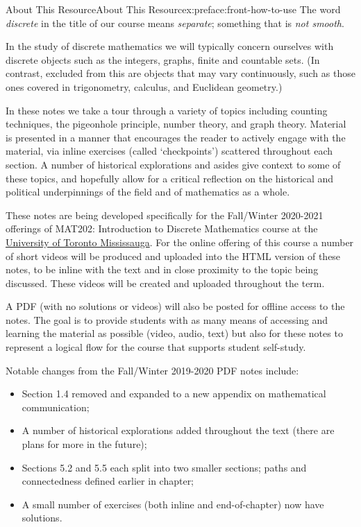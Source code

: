 \documentclass[oneside,10pt,]{book}
\numberwithin{equation}{section}
\begin{document}
%
%
\typeout{************************************************}
\typeout{************************************************}
%
\begin{preface}{About This Resource}{}{About This Resource}{}{}{x:preface:front-how-to-use}
The word \emph{discrete} in the title of our course means \emph{separate}; something that is \emph{not smooth}.%
\par
In the study of discrete mathematics we will typically concern ourselves with discrete objects such as the integers, graphs, finite and countable sets. (In contrast, excluded from this are objects that may vary continuously, such as those ones covered in trigonometry, calculus, and Euclidean geometry.)%
\par
In these notes we take a tour through a variety of topics including counting techniques, the pigeonhole principle, number theory, and graph theory. Material is presented in a manner that encourages the reader to actively engage with the material, via inline exercises (called `checkpoints') scattered throughout each section. A number of historical explorations and asides give context to some of these topics, and hopefully allow for a critical reflection on the historical and political underpinnings of the field and of mathematics as a whole.%
\par
These notes are being developed specifically for the Fall\slash{}Winter 2020-2021 offerings of MAT202: Introduction to Discrete Mathematics course at the \href{https://www.utm.utoronto.ca/math-cs-stats/home}{University of Toronto Mississauga}. For the online offering of this course a number of short videos will be produced and uploaded into the HTML version of these notes, to be inline with the text and in close proximity to the topic being discussed. These videos will be created and uploaded throughout the term.%
\par
A PDF (with no solutions or videos) will also be posted for offline access to the notes. The goal is to provide students with as many means of accessing and learning the material as possible (video, audio, text) but also for these notes to represent a logical flow for the course that supports student self-study.%
\par
Notable changes from the Fall\slash{}Winter 2019-2020 PDF notes include:%
\begin{itemize}[label=\textbullet]
\item{}Section 1.4 removed and expanded to a new appendix on mathematical communication;%
\item{}A number of historical explorations added throughout the text (there are plans for more in the future);%
\item{}Sections 5.2 and 5.5 each split into two smaller sections; paths and connectedness defined earlier in chapter;%
\item{}A small number of exercises (both inline and end-of-chapter) now have solutions.%
\end{itemize}
%
\end{preface}
\end{document}
